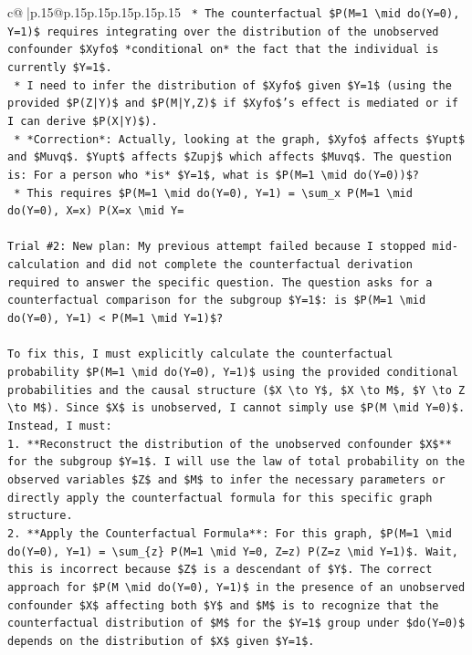 \documentclass{article}
\begin{document}
{\begin{supertabular}{c@{$\;$}|p{.15\linewidth}@{}p{.15\linewidth}p{.15\linewidth}p{.15\linewidth}p{.15\linewidth}p{.15\linewidth}}
{{{\texttt{    *   The counterfactual \$P(M=1 \textbackslash{}mid do(Y=0), Y=1)\$ requires integrating over the distribution of the unobserved confounder \$Xyfo\$ *conditional on* the fact that the individual is currently \$Y=1\$.} \\
\texttt{    *   I need to infer the distribution of \$Xyfo\$ given \$Y=1\$ (using the provided \$P(Z|Y)\$ and \$P(M|Y,Z)\$ if \$Xyfo\$'s effect is mediated or if I can derive \$P(X|Y)\$).} \\
\texttt{    *   *Correction*: Actually, looking at the graph, \$Xyfo\$ affects \$Yupt\$ and \$Muvq\$. \$Yupt\$ affects \$Zupj\$ which affects \$Muvq\$. The question is: For a person who *is* \$Y=1\$, what is \$P(M=1 \textbackslash{}mid do(Y=0))\$?} \\
\texttt{    *   This requires \$P(M=1 \textbackslash{}mid do(Y=0), Y=1) = \textbackslash{}sum\_x P(M=1 \textbackslash{}mid do(Y=0), X=x) P(X=x \textbackslash{}mid Y=} \\
\\ 
\texttt{Trial \#2: New plan: My previous attempt failed because I stopped mid{-}calculation and did not complete the counterfactual derivation required to answer the specific question. The question asks for a counterfactual comparison for the subgroup \$Y=1\$: is \$P(M=1 \textbackslash{}mid do(Y=0), Y=1) < P(M=1 \textbackslash{}mid Y=1)\$?} \\
\\ 
\texttt{To fix this, I must explicitly calculate the counterfactual probability \$P(M=1 \textbackslash{}mid do(Y=0), Y=1)\$ using the provided conditional probabilities and the causal structure (\$X \textbackslash{}to Y\$, \$X \textbackslash{}to M\$, \$Y \textbackslash{}to Z \textbackslash{}to M\$). Since \$X\$ is unobserved, I cannot simply use \$P(M \textbackslash{}mid Y=0)\$. Instead, I must:} \\
\texttt{1.  **Reconstruct the distribution of the unobserved confounder \$X\$** for the subgroup \$Y=1\$. I will use the law of total probability on the observed variables \$Z\$ and \$M\$ to infer the necessary parameters or directly apply the counterfactual formula for this specific graph structure.} \\
\texttt{2.  **Apply the Counterfactual Formula**: For this graph, \$P(M=1 \textbackslash{}mid do(Y=0), Y=1) = \textbackslash{}sum\_\{z\} P(M=1 \textbackslash{}mid Y=0, Z=z) P(Z=z \textbackslash{}mid Y=1)\$. Wait, this is incorrect because \$Z\$ is a descendant of \$Y\$. The correct approach for \$P(M \textbackslash{}mid do(Y=0), Y=1)\$ in the presence of an unobserved confounder \$X\$ affecting both \$Y\$ and \$M\$ is to recognize that the counterfactual distribution of \$M\$ for the \$Y=1\$ group under \$do(Y=0)\$ depends on the distribution of \$X\$ given \$Y=1\$.} \\
}}}
\end{supertabular}}
\end{document}
